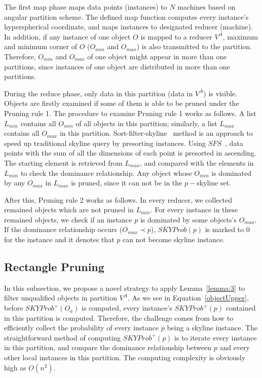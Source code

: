 The first map phase maps data points (instances) to $N$ machines based on angular partition scheme. The defined map function computes every instance's hyperspherical coordinate, and maps instances to designated reducer (machine). In addition, if any instance of one object $O$ is mapped to a reducer $V^A$, maximum and minimum corner of $O$ ($O_{min}$ and $O_{max}$) is also transmitted to the partition. Therefore, $O_{min}$ and $O_{max}$ of one object might appear in more than one partitions, since instances of one object are distributed in more than one partitions.

During the reduce phase, only data in this partition (data in $V^A$) is visible. Objects are firstly examined if some of them is able to be pruned under the Pruning rule 1. The procedure to examine Pruning rule 1 works as follows. A list $L_{min}$ contains all $O_{min}$ of all objects in this partition; similarly, a list $L_{max}$ contains all $O_{max}$ in this partition. Sort-filter-skyline~\cite{icde/ChomickiGGL03} method is an approach to speed up traditional skyline query by presorting instances. Using $SFS$~\cite{ref:SkylineSFS}, data points with the sum of all the dimensions of each point is presorted in ascending. The starting element is retrieved from $L_{max}$, and compared with the elements in $L_{min}$ to check the dominance relationship. Any object whose $O_{min}$ is dominated by any $O_{max}$ in $L_{max}$ is pruned, since it can not be in the $p-$skyline set.

After this, Pruning rule 2 works as follows. In every reducer, we collected remained objects which are not pruned in $L_{min}$. For every instance in these remained objects, we check if an instance $p$ is dominated by some objects's $O_{max}$. If the dominance relationship occurs ($O_{max} \prec p$), $SKYProb(p)$ is marked to $0$ for the instance and it denotes that $p$ can not become skyline instance.

\subsection{Rectangle Pruning}
In this subsection, we propose a novel strategy to apply Lemma~\ref{lemma:3} to filter unqualified objects in partition $V^A$. As we see in Equation~\ref{objectUpper}, before $SKYProb^{+}(O_a)$ is computed, every instance's $SKYProb^{+}(p)$ contained in this partition is computed. Therefore, the challenge comes from how to efficiently collect the probability of every instance $p$ being a skyline instance.
The straightforward method of computing $SKYProb^{+}(p)$ is to iterate every instance in this partition, and compare the dominance relationship between $p$ and every other local instances in this partition. The computing complexity is obviously high as $O(n^2)$.

